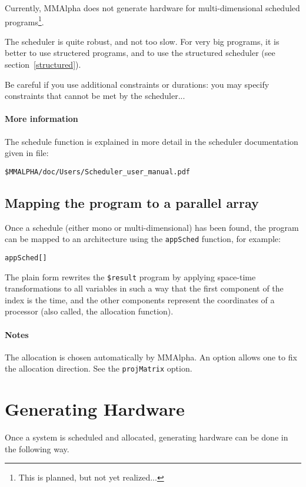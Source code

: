 \documentclass[12pt]{article}
\newcommand{\MMA}{{\sc MMAlpha}}
\newcommand{\mmalpha}{\MMA}
\begin{document}
Currently, \mmalpha{} does not generate hardware for 
multi-dimensional scheduled programs\footnote{This is 
planned, but not yet realized...}. 

The scheduler is quite robust, and not too slow. For 
very big programs, it is better to use structered 
programs, and to use the structured scheduler (see section~\ref{structured}).

Be careful if you use additional constraints or durations: you may specify
constraints that cannot be met by the scheduler...

\paragraph*{More information}
The schedule function is explained in more detail in
{the scheduler documentation}
given in file:
\begin{verbatim}
$MMALPHA/doc/Users/Scheduler_user_manual.pdf
\end{verbatim}

\subsection{Mapping the program to a parallel array}
\label{mapping}
Once a schedule (either mono or multi-dimensional) has been found, 
the program can be mapped to an architecture using the 
\texttt{appSched} function, for example:
\begin{verbatim}
appSched[]
\end{verbatim}
The plain form rewrites the \texttt{\$result} program by applying 
space-time transformations to all variables in such a 
way that the first component of the index is the time, and 
the other components represent the coordinates of a processor
(also called, the allocation function).

\paragraph*{Notes}
The allocation is chosen automatically by \mmalpha{}. 
An option allows one to fix the allocation direction. See
the \texttt{projMatrix} option. 

\section{Generating Hardware}
\label{hardware}
Once a system is scheduled and allocated, generating hardware
can be done in the following way.
\end{document}
